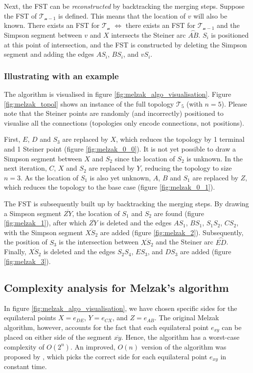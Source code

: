 \documentclass{l4proj}
\newcommand{\arc}[1]{\stackrel{\frown}{#1}}
\begin{document}
Next, the FST can be \textit{reconstructed} by backtracking the merging steps.
Suppose the FST of $\mathcal{T_{n-1}}$ is defined. This means that the location of $v$ will also be known.
There exists an FST for $\mathcal{T_n}$ $\iff$ there exists an FST for $\mathcal{T_{n-1}}$ and the Simpson segment between $v$ and $X$ intersects the Steiner arc $\arc{AB}$. $S_i$ is positioned at this point of intersection, and the FST is constructed by deleting the Simpson segment and adding the edges $AS_i$, $BS_i$, and $vS_i$.

\subsubsection{Illustrating with an example}
The algorithm is visualised in figure \ref{fig:melzak_algo_visualisation}.
Figure \ref{fig:melzak_topol} shows an instance of the full topology $\mathcal{T_5}$ (with $n = 5$). Please note that the Steiner points are randomly (and incorrectly) positioned to visualise all the connections (topologies only encode connections, not positions).

First, $E$, $D$ and $S_3$ are replaced by $X$, which reduces the topology by 1 terminal and 1 Steiner point (figure \ref{fig:melzak_0_0}). It is not yet possible to draw a Simpson segment between $X$ and $S_2$ since the location of $S_2$ is unknown.
In the next iteration, $C$, $X$ and $S_2$ are replaced by $Y$, reducing the topology to size $n = 3$. As the location of $S_1$ is also yet unknown, $A$, $B$ and $S_1$ are replaced by $Z$, which reduces the topology to the base case (figure \ref{fig:melzak_0_1}).

The FST is subsequently built up by backtracking the merging steps. By drawing a Simpson segment $\overline{ZY}$, the location of $S_1$ and $S_2$ are found (figure \ref{fig:melzak_1}), after which $\overline{ZY}$ is deleted and the edges $AS_1$, $BS_1$, $S_1S_2$, $CS_2$, with the Simpson segment $\overline{XS_2}$ are added (figure \ref{fig:melzak_2}).
Subsequently, the position of $S_3$ is the intersection between $\overline{XS_2}$ and the Steiner arc $\arc{ED}$. Finally, $\overline{XS_2}$ is deleted and the edges $S_2S_4$, $ES_3$, and $DS_3$ are added (figure \ref{fig:melzak_3}).


\subsection{Complexity analysis for Melzak's algorithm}
In figure \ref{fig:melzak_algo_visualisation}, we have chosen specific sides for the equilateral points $X = e_{DE}$, $Y = e_{CX}$, and $Z = e_{AB}$.
The original Melzak algorithm, however, accounts for the fact that each equilateral point $e_{xy}$ can be placed on either side of the segment $\overline{xy}$. Hence, the algorithm has a worst-case complexity of $O(2^n)$.
An improved, $O(n)$ version of the algorithm was proposed by \cite{Melzak_linear_time}, which picks the correct side for each equilateral point $e_{xy}$ in constant time.
\end{document}
